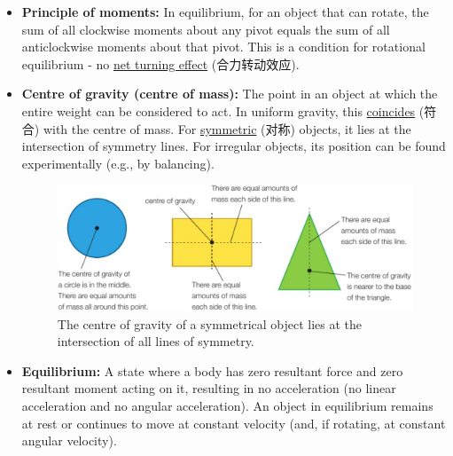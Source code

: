 \begin{itemize}
\begin{figure}[H]
    \end{figure}
    \item \textbf{Principle of moments:} In equilibrium, for an object that can rotate, the sum of all clockwise moments about
    any pivot equals the sum of all anticlockwise moments about that pivot. This is a condition for rotational equilibrium - no
    \underline{net turning effect} (合力转动效应).
    \item \textbf{Centre of gravity (centre of mass):} The point in an object at which the entire weight can be considered to act.
    In uniform gravity, this \underline{coincides} (符合) with the centre of mass. For \underline{symmetric} (对称) objects, it
    lies at the intersection of symmetry lines. For irregular objects, its position can be found experimentally (e.g., by
    balancing).
    \begin{figure}[H]
        \centering
        \includegraphics[scale=0.15]{Physics/1A/Images/1A-4-3.png}
        \caption{The centre of gravity of a symmetrical object lies at the intersection of all lines of symmetry.}
    \end{figure}
    \item \textbf{Equilibrium:} A state where a body has zero resultant force and zero resultant moment acting on it, resulting
    in no acceleration (no linear acceleration and no angular acceleration). An object in equilibrium remains at rest or continues
    to move at constant velocity (and, if rotating, at constant angular velocity).
\end{itemize}


